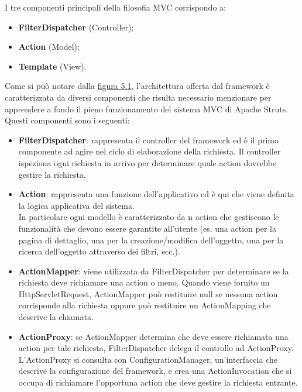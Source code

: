 \setlength{\parskip}{3ex}

\noindent I tre componenti principali della filosofia MVC corrispondo a:
\begin{itemize}
\item \textbf{FilterDispatcher} (Controller);
\item \textbf{Action} (Model);
\item \textbf{Template} (View).
\end{itemize}

\noindent Come si può notare dalla {\hyperref[fig:MVC]{figura 5.1}}, l'architettura offerta dal framework è caratterizzata da diversi componenti che risulta necessario menzionare per apprendere a fondo il pieno funzionamento del sistema MVC di Apache Struts. Questi componenti sono i seguenti: 

\begin{itemize}
\item \textbf{FilterDispatcher}: rappresenta il controller del framework ed è il primo componente ad agire nel ciclo di elaborazione della richiesta. Il controller ispeziona ogni richiesta in arrivo per determinare quale action dovrebbe gestire la richiesta.
\setlength{\parskip}{3ex}

\item \textbf{Action}: rappresenta una funzione dell'applicativo ed è qui che viene definita la logica applicativa del sistema.\\
In particolare ogni modello è caratterizzato da n action che gestiscono le funzionalità che devono essere garantite all'utente (es. una action per la pagina di dettaglio, una per la creazione/modifica dell'oggetto, una per la ricerca dell'oggetto attraverso dei filtri, ecc.).
\setlength{\parskip}{3ex}

\item \textbf{ActionMapper}: viene utilizzata da FilterDispatcher per determinare se la richiesta deve richiamare una action o meno. Quando viene fornito un HttpServletRequest, ActionMapper può restituire null se nessuna action corrisponde alla richiesta  oppure può restituire un ActionMapping che descrive la chiamata.

\setlength{\parskip}{3ex}

\item \textbf{ActionProxy}: se ActionMapper determina che deve essere richiamata una action per tale richiesta, FilterDispatcher delega il controllo ad ActionProxy. L'ActionProxy si consulta con ConfigurationManager, un'interfaccia che descrive la configurazione del framework, e crea una ActionInvocation che si occupa di richiamare l'opportuna action che deve gestire la richiesta entrante.
\setlength{\parskip}{3ex}


\end{itemize}
